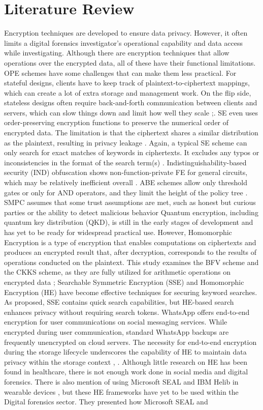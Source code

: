 \documentclass[conference]{IEEEtran}
\begin{document}
\section{Literature Review}
Encryption techniques are developed to ensure data privacy. However, it often limits a digital forensics investigator's operational capability and data access while investigating. Although there are encryption techniques that allow operations over the encrypted data, all of these have their functional limitations. OPE schemes have some challenges that can make them less practical. For stateful designs, clients have to keep track of plaintext-to-ciphertext mappings, which can create a lot of extra storage and management work. On the flip side, stateless designs often require back-and-forth communication between clients and servers, which can slow things down and limit how well they scale \cite{b1};\cite{b2}. SE even uses order-preserving encryption functions to preserve the numerical order of encrypted data. The limitation is that the ciphertext shares a similar distribution as the plaintext, resulting in privacy leakage \cite{b3}.  Again, a typical SE scheme can only search for exact matches of keywords in ciphertexts. It excludes any typos or inconsistencies in the format of the search term(s) \cite{b4}. Indistinguishability-based security (IND) obfuscation shows non-function-private FE for general circuits, which may be relatively inefficient overall \cite{b5}. ABE schemes allow only threshold gates or only for AND operators, and they limit the height of the policy tree \cite{b6}\cite{b7}. SMPC assumes that some trust assumptions are met, such as honest but curious parties or the ability to detect malicious behavior \cite{b8]} Quantum encryption, including quantum key distribution (QKD), is still in the early stages of development and has yet to be ready for widespread practical use. However, Homomorphic Encryption is a type of encryption that enables computations on ciphertexts and produces an encrypted result that, after decryption, corresponds to the results of operations conducted on the plaintext. This study examines the BFV scheme and the CKKS scheme, as they are fully utilized for arithmetic operations on encrypted data \cite{b9}\cite{b10}; \cite{b11} Searchable Symmetric Encryption (SSE) and Homomorphic Encryption (HE) have become effective techniques for securing keyword searches. As \cite{b12} proposed, SSE contains quick search capabilities, but HE-based search enhances privacy without requiring search tokens. WhatsApp offers end-to-end encryption for user communications on social messaging services. While encrypted during user communication, standard WhatsApp backups are frequently unencrypted on cloud servers. The necessity for end-to-end encryption during the storage lifecycle underscores the capability of HE to maintain data privacy within the storage context \cite{b13}, \cite{b14}. Although little research on HE has been found in healthcare, there is not enough work done in social media and digital forensics\cite{b15}. There is also mention of using Microsoft SEAL and IBM Helib in wearable devices \cite{b16}, but these HE frameworks have yet to be used within the Digital forensics sector. They presented how Microsoft SEAL and 
\end{document}
